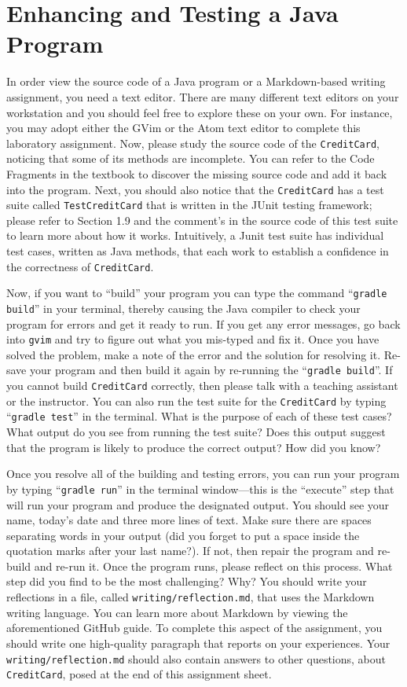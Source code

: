 \documentclass[11pt]{article}
\newcommand{\mainprogram}{\lstinline{CreditCard}}
\newcommand{\testprogram}{\lstinline{TestCreditCard}}
\newcommand{\reflection}{\lstinline{writing/reflection.md}}
\newcommand{\gradlebuild}{\command{gradle build}}
\newcommand{\gradletest}{\command{gradle test}}
\newcommand{\gradlerun}{\command{gradle run}}
\newcommand{\command}[1]{``\lstinline{#1}''}
\newcommand{\program}[1]{\lstinline{#1}}
\newcommand{\step}[1]{``{#1}''}
\begin{document}
\section*{Enhancing and Testing a Java Program}

In order view the source code of a Java program or a Markdown-based writing assignment, you need a text editor. There
are many different text editors on your workstation and you should feel free to explore these on your own. For instance,
you may adopt either the GVim or the Atom text editor to complete this laboratory assignment. Now, please study the
source code of the \mainprogram{}, noticing that some of its methods are incomplete. You can refer to the Code Fragments
in the textbook to discover the missing source code and add it back into the program. Next, you should also notice that
the \mainprogram{} has a test suite called \testprogram{} that is written in the JUnit testing framework; please refer
to Section 1.9 and the comment's in the source code of this test suite to learn more about how it works. Intuitively, a
Junit test suite has individual test cases, written as Java methods, that each work to establish a confidence in the
correctness of \mainprogram{}.

Now, if you want to \step{build} your program you can type the command \gradlebuild{} in your terminal, thereby causing
the Java compiler to check your program for errors and get it ready to run. If you get any error messages, go back into
\program{gvim} and try to figure out what you mis-typed and fix it. Once you have solved the problem, make a note of the
error and the solution for resolving it. Re-save your program and then build it again by re-running the \gradlebuild{}.
If you cannot build \mainprogram{} correctly, then please talk with a teaching assistant or the instructor. You can also
run the test suite for the \mainprogram{} by typing \gradletest{} in the terminal. What is the purpose of each of these
test cases? What output do you see from running the test suite? Does this output suggest that the program is likely to
produce the correct output? How did you know?

Once you resolve all of the building and testing errors, you can run your program by typing \gradlerun{} in the terminal
window---this is the ``execute'' step that will run your program and produce the designated output. You should see your
name, today's date and three more lines of text. Make sure there are spaces separating words in your output (did you
forget to put a space inside the quotation marks after your last name?). If not, then repair the program and re-build
and re-run it. Once the program runs, please reflect on this process. What step did you find to be the most challenging?
Why? You should write your reflections in a file, called \reflection{}, that uses the Markdown writing language. You can
learn more about Markdown by viewing the aforementioned GitHub guide. To complete this aspect of the assignment, you
should write one high-quality paragraph that reports on your experiences. Your \reflection{} should also contain answers
to other questions, about \mainprogram{}, posed at the end of this assignment sheet.
\end{document}
